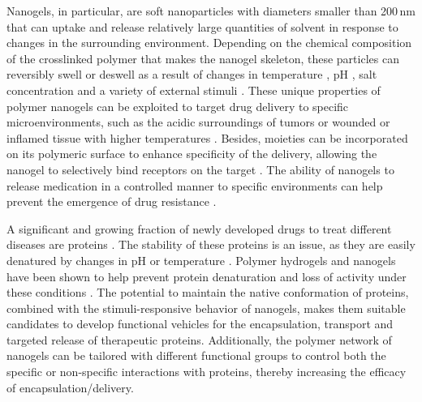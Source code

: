 Nanogels, in particular, are soft nanoparticles with diameters smaller than 200\,nm that can uptake and release relatively large quantities of solvent in response to changes in the surrounding environment.
Depending on the chemical composition of the crosslinked polymer that makes the nanogel skeleton, these particles can reversibly swell or deswell as a result of changes in temperature , pH , salt concentration  and a variety of external stimuli .
These unique properties of polymer nanogels can be exploited to target drug delivery to specific microenvironments, such as the acidic surroundings of tumors  or wounded or inflamed tissue with higher temperatures \addcite[wu2010core].
Besides, moieties can be incorporated on its polymeric surface to enhance specificity of the delivery, allowing the nanogel to selectively bind receptors on the target .
The ability of nanogels to release medication in a controlled manner to specific environments can help prevent the emergence of drug resistance .







A significant and growing fraction of newly developed drugs to treat different diseases are proteins .
The stability of these proteins is an issue, as they are easily denatured by changes in pH or temperature .
Polymer hydrogels and nanogels have been shown to help prevent protein denaturation and loss of activity under these conditions .
The potential to maintain the native conformation of proteins, combined with the stimuli-responsive behavior of nanogels, makes them suitable candidates to develop functional vehicles for the encapsulation, transport and targeted release of therapeutic proteins.
Additionally, the polymer network of nanogels can be tailored with different functional groups to control both the specific or non-specific  interactions with proteins, thereby increasing the efficacy of encapsulation/delivery.



